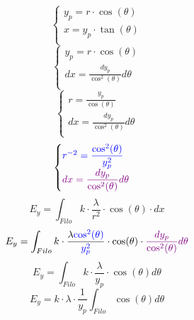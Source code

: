 \documentclass[twoside]{article}
\begin{document}
\begin{equation*}
    \begin{cases}
        y_p = r \cdot \cos(\theta) \\
        x = y_p \cdot \tan(\theta) \\
    \end{cases}
\end{equation*}
\begin{equation*}
    \begin{cases}
        y_p = r \cdot \cos(\theta)                            \\
        dx = \displaystyle \frac{dy_p}{\cos^2(\theta)}d\theta \\
    \end{cases}
\end{equation*}
\begin{equation*}
    \begin{cases}
        r = \displaystyle \frac{y_p}{\cos(\theta)}             \\
        dx = \displaystyle \frac{dy_p}{\cos^2(\theta)} d\theta \\
    \end{cases}
\end{equation*}
\begin{equation*}
    \begin{cases}
        \textcolor{blue}{r^{-2} = \displaystyle \frac{\cos^2(\theta)}{y_p^2}}       \\
        \textcolor{violet}{dx = \displaystyle \frac{dy_p}{\cos^2(\theta)} d\theta } \\
    \end{cases}
\end{equation*}
\begin{equation*}
    E_y = \displaystyle \int_{Filo} k \cdot \frac{\lambda}{r^2} \cdot \cos(\theta) \cdot dx
\end{equation*}
\begin{equation*}
    E_y = \displaystyle \int_{Filo} k \cdot \frac{\lambda\textcolor{blue}{\cos^2(\theta)}}{\textcolor{blue}{y_p^2}} \cdot \cos(\theta) \cdot \textcolor{violet}{\frac{dy_p}{\cos^2(\theta)} d\theta }
\end{equation*}
\begin{equation*}
    E_y = \displaystyle \int_{Filo} k \cdot \frac{\lambda}{y_p} \cdot \cos(\theta) d\theta
\end{equation*}
\begin{equation*}
    E_y = \displaystyle k \cdot \lambda \cdot \frac{1}{y_p} \int_{Filo} \cos(\theta) d\theta
\end{equation*}
\end{document}
